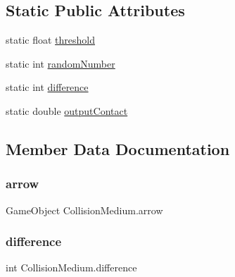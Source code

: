 \subsection*{Static Public Attributes}
\begin{DoxyCompactItemize}
\item 
static float \hyperlink{classCollisionMedium_aceeea52639179640dccbdc89a23cf68f}{threshold}
\item 
static int \hyperlink{classCollisionMedium_ab9f5306a9622044ff83bcd5089ff074b}{random\+Number}
\item 
static int \hyperlink{classCollisionMedium_a48b5162cf68a9f44464d2dae124eb668}{difference}
\item 
static double \hyperlink{classCollisionMedium_a9da853219f4d66632c2f97888cd791c0}{output\+Contact}
\end{DoxyCompactItemize}


\subsection{Member Data Documentation}
\mbox{\label{classCollisionMedium_ad4033d32f673d812057144ee995d5809}} 
\subsubsection{\texorpdfstring{arrow}{arrow}}
{\footnotesize\ttfamily Game\+Object Collision\+Medium.\+arrow}

\mbox{\label{classCollisionMedium_a48b5162cf68a9f44464d2dae124eb668}} 
\subsubsection{\texorpdfstring{difference}{difference}}
{\footnotesize\ttfamily int Collision\+Medium.\+difference\hspace{0.3cm}{\ttfamily [static]}}

\mbox{\label{classCollisionMedium_a0d0dccb87c53b398dacb1f87326ec7b3}} 
